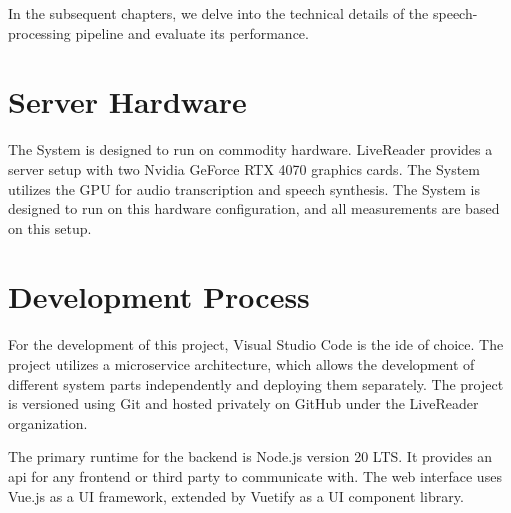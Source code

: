 In the subsequent chapters, we delve into the technical details of the speech-processing pipeline and evaluate its 
performance.


\section{Server Hardware}

The System is designed to run on commodity hardware. LiveReader provides a server setup with two Nvidia GeForce RTX 
4070 graphics cards. The System utilizes the GPU for audio transcription and speech synthesis. The System is designed 
to run on this hardware configuration, and all measurements are based on this setup.


\section{Development Process}

For the development of this project, Visual Studio Code is the \ac{ide} of choice. The project utilizes a microservice 
architecture, which allows the development of different system parts independently and deploying them separately. 
The project is versioned using Git and hosted privately on GitHub under the LiveReader organization. 

The primary runtime for the backend is Node.js version 20 LTS. It provides an \ac{api} for any frontend or third party 
to communicate with. The web interface uses Vue.js as a UI framework, extended by Vuetify as a UI component library.
